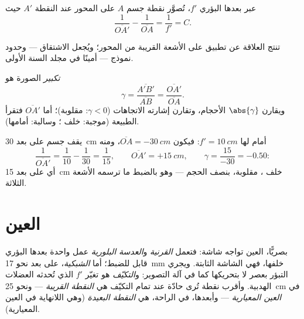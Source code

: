 \begin{theorem}\label{thm:g11:lenses-and-eye:conjugate}
عبر  بعدها البؤري $f'$، تُصوَّر نقطة جسم $A$ على
المحور عند النقطة $A'$ حيث
\[
\frac{1}{\overline{OA'}} - \frac{1}{\overline{OA}} = \frac{1}{f'} = C .
\]
\end{theorem}
\admitted

\begin{remark}
تنتج العلاقة عن تطبيق  على الأشعة القريبة من
المحور؛ ويُجعل الاشتقاق --- وحدود نموذج  ---
أمينًا في مجلد السنة الأولى.
\end{remark}

\begin{definition}[التكبير]\label{def:g11:lenses-and-eye:magnification}
\emph{تكبير} الصورة هو
\[
\gamma = \frac{\overline{A'B'}}{\overline{AB}}
       = \frac{\overline{OA'}}{\overline{OA}} .
\]
ويقارن $\abs{\gamma}$ الأحجام، وتقارن إشارته الاتجاهات ($\gamma < 0$:
مقلوبة)؛ أما  $\overline{OA'}$ فتقرأ الطبيعة (موجبة:
 خلف ؛ وسالبة:  أمامها).
\end{definition}

\begin{example}\label{ex:g11:lenses-and-eye:conjugate}
يقف جسم على بعد \qty{30}{cm} أمام  لها
$f' = \qty{10}{cm}$: فيكون $\overline{OA} = \qty{-30}{cm}$، ومنه
\[
\frac{1}{\overline{OA'}} = \frac{1}{10} - \frac{1}{30} = \frac{1}{15},
\qquad \overline{OA'} = +\qty{15}{cm},
\qquad \gamma = \frac{15}{-30} = -0.50 :
\]
أي  على بعد \qty{15}{cm} خلف ، مقلوبة، بنصف الحجم ---
وهو بالضبط ما ترسمه الأشعة الثلاثة.
\end{example}

\section{العين}

\begin{definition}\label{def:g11:lenses-and-eye:eye}
بصريًّا، العين  تواجه شاشة: فتعمل
\emph{القرنية} و\emph{العدسة البلورية} عمل  واحدة بعدها البؤري قابل للضبط؛ أما
\emph{الشبكية}، على بعد نحو \qty{17}{mm} خلفها، فهي الشاشة
الثابتة. ويجري التبؤر بعصر  لا بتحريكها كما في
آلة التصوير: و\emph{التكيّف} هو تغيّر
$f'$ الذي تُحدثه العضلات الهدبية. وأقرب نقطة تُرى حادّة عند تمام
التكيّف هي \emph{النقطة القريبة} --- ونحو
\qty{25}{cm} في \emph{العين المعيارية} --- وأبعدها،
في الراحة، هي \emph{النقطة البعيدة} (وهي اللانهاية في
العين المعيارية).
\end{definition}

